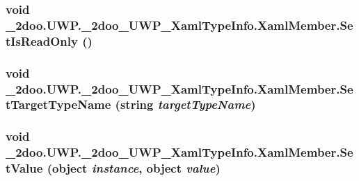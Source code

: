 \hypertarget{class__2doo_1_1_u_w_p_1_1__2doo___u_w_p___xaml_type_info_1_1_xaml_member_686dd14e0203d301bd46a6a5b05d5575}{
\subsubsection[{SetIsReadOnly}]{\setlength{\rightskip}{0pt plus 5cm}void \_\-2doo.UWP.\_\-2doo\_\-UWP\_\-XamlTypeInfo.XamlMember.SetIsReadOnly ()}}
\label{class__2doo_1_1_u_w_p_1_1__2doo___u_w_p___xaml_type_info_1_1_xaml_member_686dd14e0203d301bd46a6a5b05d5575}


\hypertarget{class__2doo_1_1_u_w_p_1_1__2doo___u_w_p___xaml_type_info_1_1_xaml_member_35eb1ed68f25e132f0a034ca4fd57d42}{
\subsubsection[{SetTargetTypeName}]{\setlength{\rightskip}{0pt plus 5cm}void \_\-2doo.UWP.\_\-2doo\_\-UWP\_\-XamlTypeInfo.XamlMember.SetTargetTypeName (string {\em targetTypeName})}}
\label{class__2doo_1_1_u_w_p_1_1__2doo___u_w_p___xaml_type_info_1_1_xaml_member_35eb1ed68f25e132f0a034ca4fd57d42}


\hypertarget{class__2doo_1_1_u_w_p_1_1__2doo___u_w_p___xaml_type_info_1_1_xaml_member_08032575a0901ca53824538588ba7d9d}{
\subsubsection[{SetValue}]{\setlength{\rightskip}{0pt plus 5cm}void \_\-2doo.UWP.\_\-2doo\_\-UWP\_\-XamlTypeInfo.XamlMember.SetValue (object {\em instance}, \/  object {\em value})}}
\label{class__2doo_1_1_u_w_p_1_1__2doo___u_w_p___xaml_type_info_1_1_xaml_member_08032575a0901ca53824538588ba7d9d}




